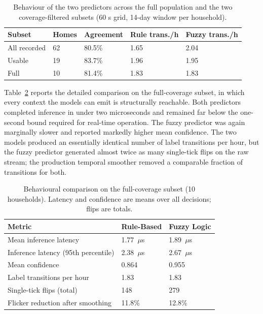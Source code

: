 \begin{table}[htbp]
\captionsetup{justification=centering}
\caption{Behaviour of the two predictors across the full population and the two
coverage-filtered subsets (60 s grid, 14-day window per household).}
\label{tab:hslu-subsets}
\centering
\small
\renewcommand{\arraystretch}{1.2}
\begin{tabular}{@{}p{} p{} p{} p{} p{}@{}}
\hline
\textbf{Subset} & \textbf{Homes} & \textbf{Agreement} & \textbf{Rule trans./h} & \textbf{Fuzzy trans./h} \\
\hline
All recorded & 62 & 80.5\% & 1.65 & 2.04 \\
Usable       & 19 & 83.7\% & 1.96 & 1.95 \\
Full         & 10 & 81.4\% & 1.83 & 1.83 \\
\hline
\end{tabular}
\end{table}

Table~\ref{tab:hslu-behaviour} reports the detailed comparison on the
full-coverage subset, in which every context the models can emit is structurally
reachable. Both predictors completed inference in under two microseconds and
remained far below the one-second bound required for real-time operation. The
fuzzy predictor was again marginally slower and reported markedly higher mean
confidence. The two models produced an essentially identical number of label
transitions per hour, but the fuzzy predictor generated almost twice as many
single-tick flips on the raw stream; the production temporal smoother removed a
comparable fraction of transitions for both.

\begin{table}[htbp]
\captionsetup{justification=centering}
\caption{Behavioural comparison on the full-coverage subset (10 households).
Latency and confidence are means over all decisions; flips are totals.}
\label{tab:hslu-behaviour}
\centering
\small
\renewcommand{\arraystretch}{1.2}
\begin{tabular}{@{}p{} p{} p{}@{}}
\hline
\textbf{Metric} & \textbf{Rule-Based} & \textbf{Fuzzy Logic} \\
\hline
Mean inference latency & 1.77~$\mu$s & 1.89~$\mu$s \\
Inference latency (95th percentile) & 2.38~$\mu$s & 2.67~$\mu$s \\
Mean confidence & 0.864 & 0.955 \\
Label transitions per hour & 1.83 & 1.83 \\
Single-tick flips (total) & 148 & 279 \\
Flicker reduction after smoothing & 11.8\% & 12.8\% \\
\hline
\end{tabular}
\end{table}

